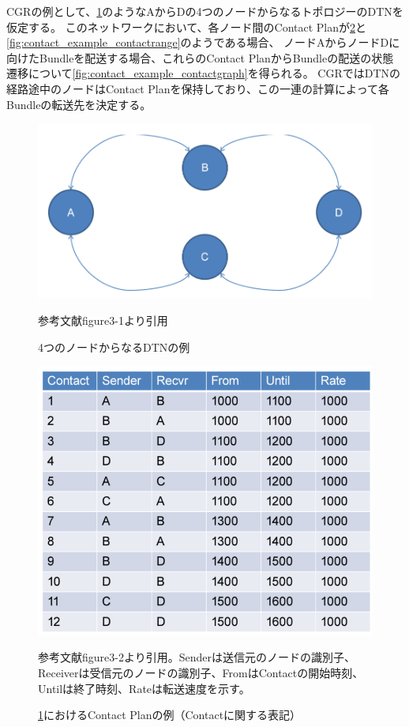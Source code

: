 CGRの例として、\ref{fig:contact_example_topology}のようなAからDの4つのノードからなるトポロジーのDTNを仮定する。
このネットワークにおいて、各ノード間のContact Planが\ref{fig:contact_example_contactplan}と\ref{fig:contact_example_contactrange}のようである場合、
ノードAからノードDに向けたBundleを配送する場合、これらのContact PlanからBundleの配送の状態遷移について\ref{fig:contact_example_contactgraph}を得られる。
CGRではDTNの経路途中のノードはContact Planを保持しており、この一連の計算によって各Bundleの転送先を決定する。
\begin{figure}[tbh]
    \centering
    \includegraphics[width=0.5\textheight]{img/contact_example_topology.pdf}
    \caption{4つのノードからなるDTNの例}
    \label{fig:contact_example_topology}
    \begin{minipage}{\textwidth}
        \centering
        参考文献\cite{schedule_aware_bundle_routing}figure3-1より引用
    \end{minipage}
\end{figure}
\begin{figure}[tbh]
    \centering
    \includegraphics[width=0.5\textheight]{img/contact_example_contactplan.pdf}
    \caption{\ref{fig:contact_example_topology}におけるContact Planの例（Contactに関する表記）}
    \label{fig:contact_example_contactplan}
    \begin{minipage}{\textwidth}
        \raggedright
        参考文献\cite{schedule_aware_bundle_routing}figure3-2より引用。Senderは送信元のノードの識別子、Receiverは受信元のノードの識別子、FromはContactの開始時刻、Untilは終了時刻、Rateは転送速度を示す。
    \end{minipage}
\end{figure}
